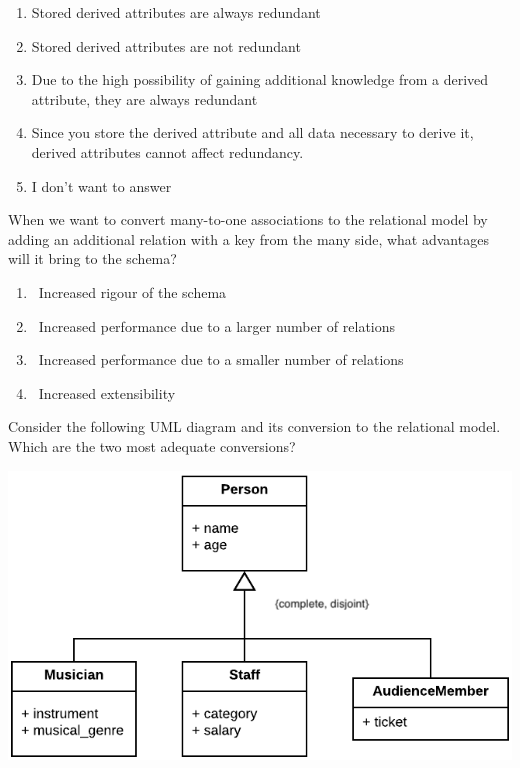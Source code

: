 \documentclass{bdad}
\begin{document}
\begin{enumerate}
    \item Stored derived attributes are always redundant
    \item Stored derived attributes are not redundant
    \item Due to the high possibility of gaining additional knowledge from a derived attribute, they are always redundant
    \item Since you store the derived attribute and all data necessary to derive it, derived attributes cannot affect redundancy.
    \item I don't want to answer
\end{enumerate}

When we want to convert many-to-one associations to the relational model by adding an additional relation with a key from the many side, what advantages will it bring to the schema?

\begin{enumerate}
    \item \checkbox~Increased rigour of the schema
    \item \checkbox~Increased performance due to a larger number of relations
    \item \checkbox~Increased performance due to a smaller number of relations
    \item \checkbox~Increased extensibility
\end{enumerate}

\newpage
{}
Consider the following UML diagram and its conversion to the relational model. Which are the two most adequate conversions?

\begin{center}
    \includegraphics[scale=0.3]{2020T-07.png}
\end{center}
\end{document}
